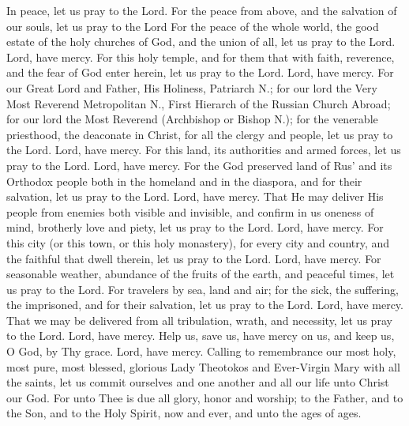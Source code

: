 \begin{liturgicaltext}
    \deacon In peace, let us pray to the Lord.
    \choir {}
    \deacon For the peace from above, and the salvation of our souls, let us pray to the Lord
    \choir {}
    \deacon For the peace of the whole world, the good estate of the holy churches of God, and the union of all, let us pray to the Lord.
    \choir Lord, have mercy.
    \deacon For this holy temple, and for them that with faith, reverence, and the fear of God enter herein, let us pray to the Lord.
    \choir Lord, have mercy.
    \deacon For our Great Lord and Father, His Holiness, Patriarch N.; for our lord the Very Most Reverend Metropolitan N., First Hierarch of the Russian Church Abroad; for our lord the Most Reverend (Archbishop or Bishop N.); for the venerable priesthood, the deaconate in Christ, for all the clergy and people, let us pray to the Lord.
    \choir Lord, have mercy.
    \deacon For this land, its authorities and armed forces, let us pray to the Lord.
    \choir Lord, have mercy.
    \deacon For the God preserved land of Rus' and its Orthodox people both in the homeland and in the diaspora, and for their salvation, let us pray to the Lord.
    \choir Lord, have mercy.
    \deacon That He may deliver His people from enemies both visible and invisible, and confirm in us oneness of mind, brotherly love and piety, let us pray to the Lord.
    \choir Lord, have mercy.
    \deacon For this city (or this town, or this holy monastery), for every city and country, and the faithful that dwell therein, let us pray to the Lord.
    \choir Lord, have mercy.
    \deacon For seasonable weather, abundance of the fruits of the earth, and peaceful times, let us pray to the Lord.
    \deacon For travelers by sea, land and air; for the sick, the suffering, the imprisoned, and for their salvation, let us pray to the Lord.
    \choir Lord, have mercy.
    \deacon That we may be delivered from all tribulation, wrath, and necessity, let us pray to the Lord.
    \choir Lord, have mercy.
    \deacon Help us, save us, have mercy on us, and keep us, O God, by Thy grace.
    \choir Lord, have mercy.
    \deacon Calling to remembrance our most holy, most pure, most blessed, glorious Lady Theotokos and Ever-Virgin Mary with all the saints, let us commit ourselves and one another and all our life unto Christ our God.
    \choir {}
    \priest For unto Thee is due all glory, honor and worship; to the Father, and to the Son, and to the Holy Spirit, now and ever, and unto the ages of ages.\normalfont

 \end{liturgicaltext}